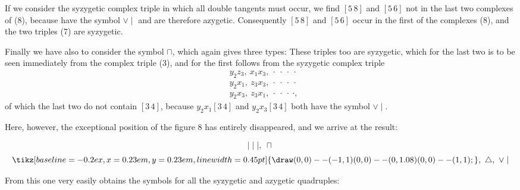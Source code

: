 \providecommand{\weberthreeup}{\mathord{\tikz[baseline=-0.2ex,x=0.23em,y=0.23em,line width=0.45pt]{\draw (0,0)--(-1,1) (0,0)--(0,1.08) (0,0)--(1,1);}}}
If we consider the syzygetic complex triple
in which all double tangents must occur, we find $[5\,8]$ and
$[5\,6]$ not in the last two complexes of (8),
because
have the symbol $\vee\mid$ and are therefore azygetic. Consequently
$[5\,8]$ and $[5\,6]$ occur in the first of the complexes (8), and the
two triples (7) are syzygetic.

Finally we have also to consider the symbol $\sqcap$, which
again gives three types:
These triples too are syzygetic, which for the last two is to be
seen immediately from the complex triple (3), and for
the first follows from the syzygetic complex triple
\[
\begin{aligned}
&y_2 z_3,\ x_1 x_3,\ \cdot\ \cdot\ \cdot\ \cdot\\
&y_2 x_1,\ z_3 x_3,\ \cdot\ \cdot\ \cdot\ \cdot\\
&y_2 x_3,\ z_3 x_1,\ \cdot\ \cdot\ \cdot\ \cdot,
\end{aligned}
\]
of which the last two do not contain $[3\,4]$, because
$y_2 x_1 [3\,4]$ and $y_2 x_3 [3\,4]$ both have the symbol $\vee\mid$.

Here, however, the exceptional position of the figure 8 has entirely
disappeared, and we arrive at the result:

\[
\mid\mid\mid,\ \sqcap
\]
\[
\weberthreeup,\ \triangle,\ \vee\mid
\]

From this one very easily obtains the symbols for all the
syzygetic and azygetic quadruples:
